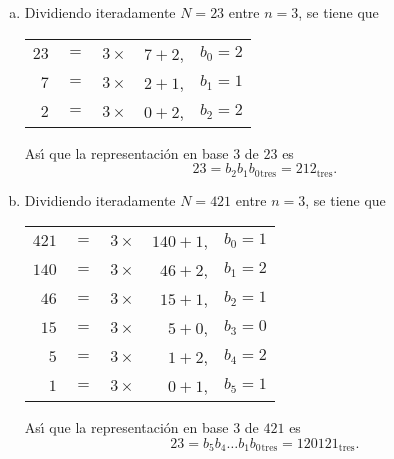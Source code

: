 \begin{solucion}
\begin{enumerate}[(a)]
  \item Dividiendo iteradamente $N=23$ entre $n=3$, se tiene que
  \begin{center}
   \begin{tabular}{rclrr}
    $23$ & $=$ & $3\times$ & $7+2$, & $b_0 = 2$ \\
    $7$ & $=$ & $3\times$ & $2 +1$, & $b_1 = 1$ \\
    $2$  & $=$ & $3\times$ & $0 +2$, & $b_2 = 2$
   \end{tabular}
  \end{center}
  As\'{\i} que la representaci\'on en base $3$ de $23$ es
  \begin{equation*}
   23 = b_2 b_1 b_{0}{}_{\text{tres}} = 212_{\text{tres}}.
  \end{equation*}

  \item Dividiendo iteradamente $N=421$ entre $n=3$, se tiene que
  \begin{center}
   \begin{tabular}{rclrr}
    $421$ & $=$ & $3\times$ & $140 + 1$, & $b_0 = 1$ \\
    $140$ & $=$ & $3\times$ & $46 + 2$, & $b_1 = 2$ \\
    $46$  & $=$ & $3\times$ & $15 + 1$, & $b_2 = 1$ \\
    $15$ & $=$ & $3\times$ & $5 + 0$, & $b_3 = 0$ \\
    $5$  & $=$ & $3\times$ & $1 + 2$, & $b_4 = 2$ \\
    $1$  & $=$ & $3\times$ & $0 + 1$, & $b_5 = 1$
   \end{tabular}
  \end{center}
  As\'{\i} que la representaci\'on en base $3$ de $421$ es
  \begin{equation*}
   23 = b_5 b_4 \ldots  b_1 b_{0}{}_{\text{tres}} = 120121_{\text{tres}}.
  \end{equation*}


\end{enumerate}
\end{solucion}
